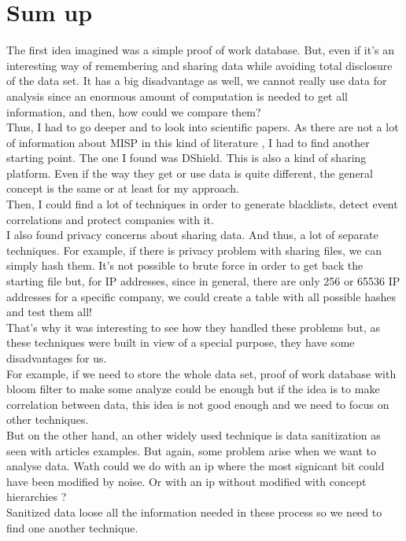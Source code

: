 \documentclass[10pt]{article}
\begin{document}
\section{Sum up}
The first idea imagined was a simple proof of work database. But, even if it's an interesting way of remembering and sharing data while avoiding total disclosure of the data set. It has a big disadvantage as well, we cannot really use data for analysis since an enormous amount of computation is needed to get all information, and then, how could we compare them?\\
Thus, I had to go deeper and to look into scientific papers. As there are not a lot of information about MISP in this kind of literature , I had to find another starting point. The one I found was DShield. This is also a kind of sharing platform. Even if the way they get or use data is quite different, the general concept is the same or at least for my approach.\\
Then, I could find a lot of techniques in order to generate blacklists, detect event correlations and protect companies with it.\\
I also found privacy concerns about sharing data. And thus, a lot of separate techniques. For example, if there is privacy problem with sharing files, we can simply hash them. It's not possible to brute force in order to get back the starting file but, for IP addresses, since in general, there are only 256 or 65536 IP addresses for a specific company, we could create a table with all possible hashes and test them all!\\
That's why it was interesting to see how they handled these problems but, as these techniques were built in view of a special purpose, they have some disadvantages for us. \\
For example, if we need to store the whole data set, proof of work database with bloom filter to make some analyze could be enough but if the idea is to make correlation between data, this idea is not good enough and we need to focus on other techniques.\\
But on the other hand, an other widely used technique is data sanitization as seen with articles examples. But again, some problem arise when we want to analyse data. Wath could we do with an ip where the most signicant bit could have been modified by noise. Or with an ip without modified with concept hierarchies ? \\
Sanitized data loose all the information needed in these process so we need to find one another technique.\\
\end{document}
